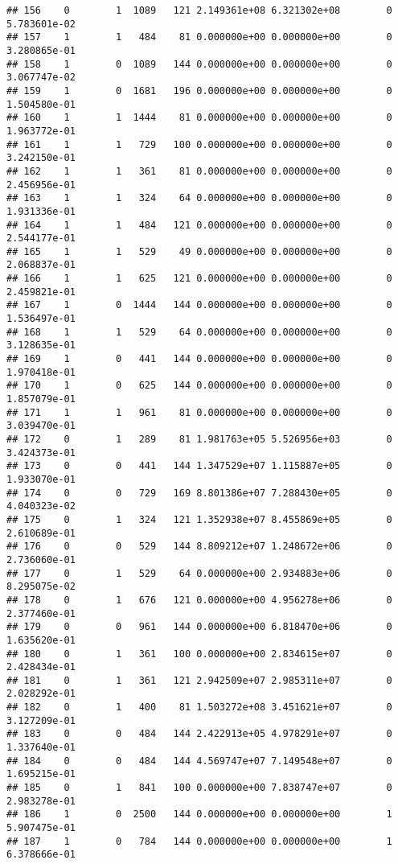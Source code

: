 \documentclass[
]{article}
\begin{document}
\begin{enumerate}
\begin{verbatim}
## 156    0        1  1089   121 2.149361e+08 6.321302e+08        0  5.783601e-02
## 157    1        1   484    81 0.000000e+00 0.000000e+00        0  3.280865e-01
## 158    1        0  1089   144 0.000000e+00 0.000000e+00        0  3.067747e-02
## 159    1        0  1681   196 0.000000e+00 0.000000e+00        0  1.504580e-01
## 160    1        1  1444    81 0.000000e+00 0.000000e+00        0  1.963772e-01
## 161    1        1   729   100 0.000000e+00 0.000000e+00        0  3.242150e-01
## 162    1        1   361    81 0.000000e+00 0.000000e+00        0  2.456956e-01
## 163    1        1   324    64 0.000000e+00 0.000000e+00        0  1.931336e-01
## 164    1        1   484   121 0.000000e+00 0.000000e+00        0  2.544177e-01
## 165    1        1   529    49 0.000000e+00 0.000000e+00        0  2.068837e-01
## 166    1        1   625   121 0.000000e+00 0.000000e+00        0  2.459821e-01
## 167    1        0  1444   144 0.000000e+00 0.000000e+00        0  1.536497e-01
## 168    1        1   529    64 0.000000e+00 0.000000e+00        0  3.128635e-01
## 169    1        0   441   144 0.000000e+00 0.000000e+00        0  1.970418e-01
## 170    1        0   625   144 0.000000e+00 0.000000e+00        0  1.857079e-01
## 171    1        1   961    81 0.000000e+00 0.000000e+00        0  3.039470e-01
## 172    0        1   289    81 1.981763e+05 5.526956e+03        0  3.424373e-01
## 173    0        0   441   144 1.347529e+07 1.115887e+05        0  1.933070e-01
## 174    0        0   729   169 8.801386e+07 7.288430e+05        0  4.040323e-02
## 175    0        1   324   121 1.352938e+07 8.455869e+05        0  2.610689e-01
## 176    0        0   529   144 8.809212e+07 1.248672e+06        0  2.736060e-01
## 177    0        1   529    64 0.000000e+00 2.934883e+06        0  8.295075e-02
## 178    0        1   676   121 0.000000e+00 4.956278e+06        0  2.377460e-01
## 179    0        0   961   144 0.000000e+00 6.818470e+06        0  1.635620e-01
## 180    0        1   361   100 0.000000e+00 2.834615e+07        0  2.428434e-01
## 181    0        1   361   121 2.942509e+07 2.985311e+07        0  2.028292e-01
## 182    0        1   400    81 1.503272e+08 3.451621e+07        0  3.127209e-01
## 183    0        0   484   144 2.422913e+05 4.978291e+07        0  1.337640e-01
## 184    0        0   484   144 4.569747e+07 7.149548e+07        0  1.695215e-01
## 185    0        1   841   100 0.000000e+00 7.838747e+07        0  2.983278e-01
## 186    1        0  2500   144 0.000000e+00 0.000000e+00        1  5.907475e-01
## 187    1        0   784   144 0.000000e+00 0.000000e+00        1  6.378666e-01

\end{verbatim}
\end{enumerate}
\end{document}
